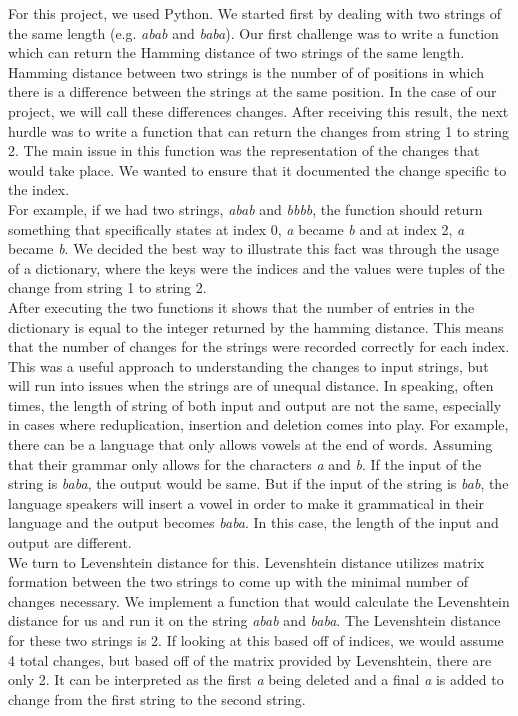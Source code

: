 \documentclass{article}
\begin{document}
For this project, we used Python. We started first by dealing with two strings of the same length (e.g. \textit{abab} and \textit{baba}). Our first challenge was to write a function which can return the Hamming distance of two strings of the same length.  Hamming distance between two strings is the number of of positions in which there is a difference between the strings at the same position. In the case of our project, we will call these differences changes. \cite{hamming} After receiving this result, the next hurdle was to write a function that can return the changes from string 1 to string 2. The main issue in this function was the representation of the changes that would take place. We wanted to ensure that it documented the change specific to the index. \\

For example, if we had two strings, \textit{abab} and \textit{bbbb}, the function should return something that specifically states at index 0, \textit{a} became \textit{b} and at index 2, \textit{a} became \textit{b}. We decided the best way to illustrate this fact was through the usage of a dictionary, where the keys were the indices and the values were tuples of the change from string 1 to string 2. \\

After executing the two functions it shows that the number of entries in the dictionary is equal to the integer returned by the hamming distance. This means that the number of changes for the strings were recorded correctly for each index. This was a useful approach to understanding the changes to input strings, but will run into issues when the strings are of unequal distance. In speaking, often times, the length of string of both input and output are not the same, especially in cases where reduplication, insertion and deletion comes into play. For example, there can be a language that only allows vowels at the end of words. Assuming that their grammar only allows for the characters \textit{a} and \textit{b}. If the input of the string is \textit{baba}, the output would be same. But if the input of the string is \textit{bab}, the language speakers will insert a vowel in order to make it grammatical in their language and the output becomes \textit{baba}. In this case, the length of the input and output are different. \\

We turn to Levenshtein distance for this. Levenshtein distance utilizes matrix formation between the two strings to come up with the minimal number of changes necessary. \cite{leven} We implement a function that would calculate the Levenshtein distance for us and run it on the string \textit{abab} and \textit{baba}. \cite{stackabuse} The Levenshtein distance for these two strings is 2. If looking at this based off of indices, we would assume 4 total changes, but based off of the matrix provided by Levenshtein, there are only 2. It can be interpreted as the first \textit{a} being deleted and a final \textit{a} is added to change from the first string to the second string. \\
\end{document}
